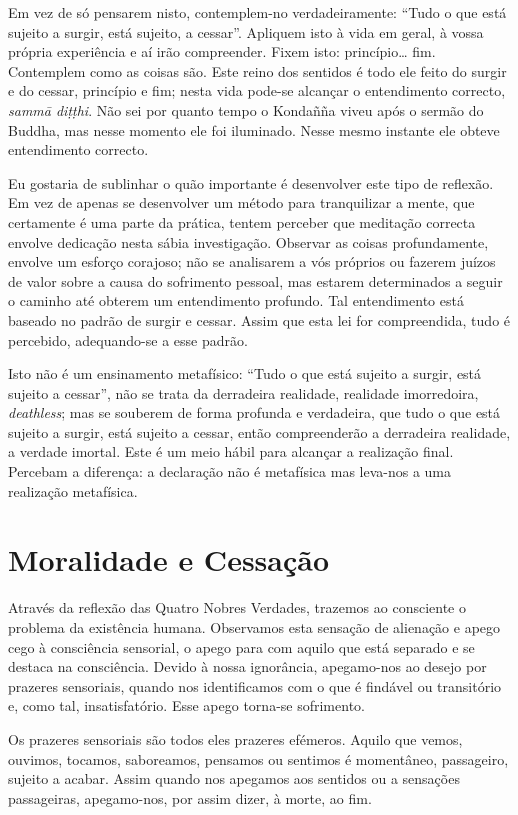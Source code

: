 Em vez de só pensarem nisto, contemplem-no verdadeiramente: “Tudo o que está
sujeito a surgir, está sujeito, a cessar”. Apliquem isto à vida em geral, à
vossa própria experiência e aí irão compreender. Fixem isto: princípio\ldots{}
fim. Contemplem como as coisas são. Este reino dos sentidos é todo ele feito do
surgir e do cessar, princípio e fim; nesta vida pode-se alcançar o entendimento
correcto, \emph{sammā diṭṭhi}. Não sei por quanto tempo o Kondañña viveu após o
sermão do Buddha, mas nesse momento ele foi iluminado. Nesse mesmo instante ele
obteve entendimento correcto.

Eu gostaria de sublinhar o quão importante é desenvolver este tipo de reflexão.
Em vez de apenas se desenvolver um método para tranquilizar a mente, que
certamente é uma parte da prática, tentem perceber que meditação correcta
envolve dedicação nesta sábia investigação. Observar as coisas profundamente,
envolve um esforço corajoso; não se analisarem a vós próprios ou fazerem juízos
de valor sobre a causa do sofrimento pessoal, mas estarem determinados a seguir
o caminho até obterem um entendimento profundo. Tal entendimento está baseado no
padrão de surgir e cessar. Assim que esta lei for compreendida, tudo é
percebido, adequando-se a esse padrão.

Isto não é um ensinamento metafísico: “Tudo o que está sujeito a surgir, está
sujeito a cessar”, não se trata da derradeira realidade, realidade imorredoira,
\emph{deathless}; mas se souberem de forma profunda e verdadeira, que tudo o que
está sujeito a surgir, está sujeito a cessar, então compreenderão a derradeira
realidade, a verdade imortal. Este é um meio hábil para alcançar a realização
final. Percebam a diferença: a declaração não é metafísica mas leva-nos a uma
realização metafísica.

\section{Moralidade e Cessação}

Através da reflexão das Quatro Nobres Verdades, trazemos ao consciente o
problema da existência humana. Observamos esta sensação de alienação e apego
cego à consciência sensorial, o apego para com aquilo que está separado e se
destaca na consciência. Devido à nossa ignorância, apegamo-nos ao desejo por
prazeres sensoriais, quando nos identificamos com o que é findável ou
transitório e, como tal, insatisfatório. Esse apego torna-se sofrimento.

Os prazeres sensoriais são todos eles prazeres efémeros. Aquilo que vemos,
ouvimos, tocamos, saboreamos, pensamos ou sentimos é momentâneo, passageiro,
sujeito a acabar. Assim quando nos apegamos aos sentidos ou a sensações
passageiras, apegamo-nos, por assim dizer, à morte, ao fim.


